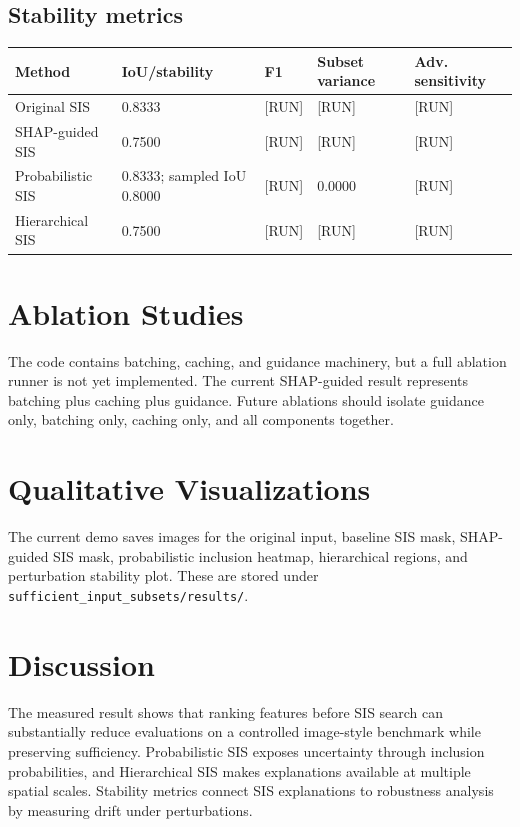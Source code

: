 \documentclass[11pt]{article}
\begin{document}
\subsection{Stability metrics}
\begin{table}[h]
\centering
\small
\begin{tabular}{lllll}
\toprule
Method & IoU/stability & F1 & Subset variance & Adv. sensitivity \\
\midrule
Original SIS & 0.8333 & [RUN] & [RUN] & [RUN] \\
SHAP-guided SIS & 0.7500 & [RUN] & [RUN] & [RUN] \\
Probabilistic SIS & 0.8333; sampled IoU 0.8000 & [RUN] & 0.0000 & [RUN] \\
Hierarchical SIS & 0.7500 & [RUN] & [RUN] & [RUN] \\
\bottomrule
\end{tabular}
\end{table}

\section{Ablation Studies}
The code contains batching, caching, and guidance machinery, but a full ablation runner is not yet implemented. The current SHAP-guided result represents batching plus caching plus guidance. Future ablations should isolate guidance only, batching only, caching only, and all components together.

\section{Qualitative Visualizations}
The current demo saves images for the original input, baseline SIS mask, SHAP-guided SIS mask, probabilistic inclusion heatmap, hierarchical regions, and perturbation stability plot. These are stored under \texttt{sufficient\_input\_subsets/results/}.

\section{Discussion}
The measured result shows that ranking features before SIS search can substantially reduce evaluations on a controlled image-style benchmark while preserving sufficiency. Probabilistic SIS exposes uncertainty through inclusion probabilities, and Hierarchical SIS makes explanations available at multiple spatial scales. Stability metrics connect SIS explanations to robustness analysis by measuring drift under perturbations.
\end{document}
